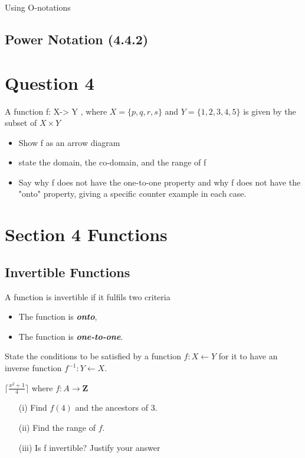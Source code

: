 \documentclass[]{report}
\begin{document}
Using O-notations

\subsection*{Power Notation (4.4.2)}




\section*{Question 4}

A function f: X-> Y , where $X = \{p,q,r,s\}$ and $Y =\{1,2,3,4,5\}$
is given by the subset of $X \times Y$


\begin{itemize}
	\item Show f as an arrow diagram
	\item state the domain, the co-domain, and the range of f
	\item Say why f does not have the one-to-one property and why f does 
	not have the "onto" property, giving a specific counter example in each case.
\end{itemize}


\section{Section 4 Functions}

\subsection{Invertible Functions}
A function is invertible if it fulfils two criteria
\begin{itemize}
	\item The function is \textbf{\textit{onto}},
	\item The function is \textbf{\textit{one-to-one}}.
\end{itemize}

State the conditions to be satisfied by a function
$f : X \leftarrow Y$ for it to have an inverse function
$f^{-1} : Y \leftarrow X$.

$\lceil \frac{x^2+1}{4} \rceil$
where $f : A \rightarrow \textbf{Z}$
\begin{itemize}
	\item[(i)] Find $f(4)$ and the ancestors of 3.
	\item[(ii)] Find the range of $f$.
	\item[(iii)] Is f invertible? Justify your answer
\end{itemize}
\end{document}
